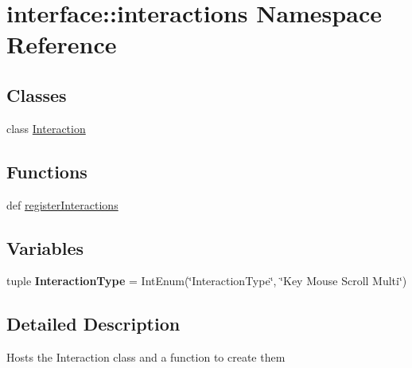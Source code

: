 \hypertarget{namespaceinterface_1_1interactions}{\section{interface\-:\-:interactions \-Namespace \-Reference}
\label{namespaceinterface_1_1interactions}
}
\subsection*{\-Classes}
\begin{DoxyCompactItemize}
\item 
class \hyperlink{classinterface_1_1interactions_1_1_interaction}{\-Interaction}
\end{DoxyCompactItemize}
\subsection*{\-Functions}
\begin{DoxyCompactItemize}
\item 
def \hyperlink{namespaceinterface_1_1interactions_af1cb6c299b4f00cac678f8a268745c4b}{register\-Interactions}
\end{DoxyCompactItemize}
\subsection*{\-Variables}
\begin{DoxyCompactItemize}
\item 
\hypertarget{namespaceinterface_1_1interactions_acb1b335d82390a3658deaf078fc51328}{tuple {\bfseries \-Interaction\-Type} = \-Int\-Enum(\char`\"{}\-Interaction\-Type\char`\"{}, \char`\"{}\-Key \-Mouse \-Scroll \-Multi\char`\"{})}\label{namespaceinterface_1_1interactions_acb1b335d82390a3658deaf078fc51328}

\end{DoxyCompactItemize}


\subsection{\-Detailed \-Description}
\begin{DoxyVerb}Hosts the Interaction class and a function to create them \end{DoxyVerb}
 

